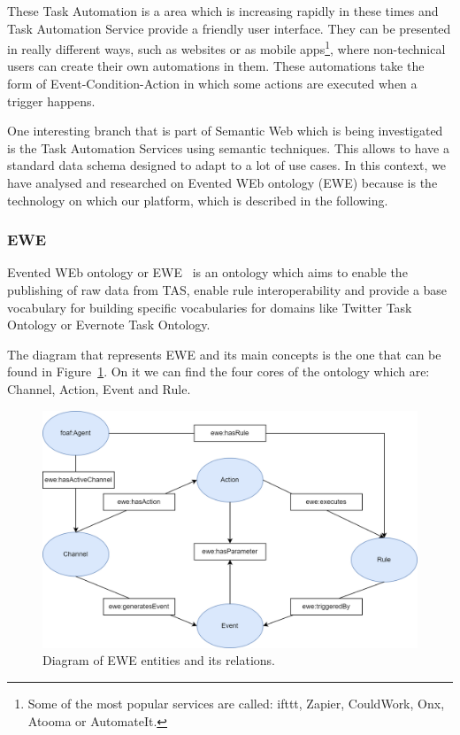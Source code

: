 These Task Automation is a area which is increasing rapidly in these times and Task Automation Service provide a friendly user interface. They can be presented in really different ways, such as websites or as mobile apps\footnote{Some of the most popular services are called: ifttt, Zapier, CouldWork, Onx, Atooma or AutomateIt.}, where non-technical users can create their own automations in them. These automations take the form of Event-Condition-Action in which some actions are executed when a trigger happens. 

One interesting branch that is part of Semantic Web which is being investigated~\cite{electronics9081194} is the Task Automation Services using semantic techniques. This allows to have a standard data schema designed to adapt to a lot of use cases. In this context, we have analysed and researched on Evented WEb ontology (EWE) because is the technology on which our platform, which is described in the following.

\subsubsection{EWE}
Evented WEb ontology or EWE~\cite{EWEOntol89:online} is an ontology which aims to enable the publishing of raw data from TAS, enable rule interoperability and provide a base vocabulary for building specific vocabularies for domains like Twitter Task Ontology or Evernote Task Ontology.

The diagram that represents EWE and its main concepts is the one that can be found in Figure~\ref{fig:ewediagram}. On it we can find the four cores of the ontology which are: Channel, Action, Event and Rule. 

\begin{figure}[!htp]
    \centering
    \includegraphics[scale=0.28]{img/state-of-art/EWEdiagram.png}
    \caption{Diagram of EWE entities and its relations.}
    \label{fig:ewediagram}
\end{figure}

